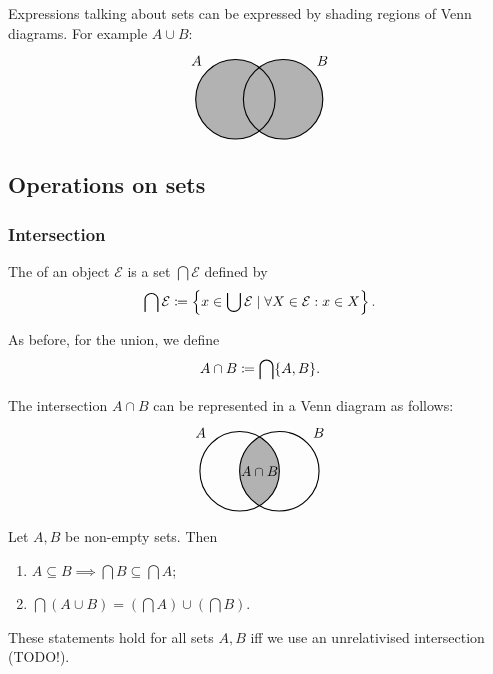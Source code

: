 Expressions talking about sets can be expressed by shading regions of Venn diagrams. For example $A\cup B$:
\[ \begin{tikzpicture}[thick,
    set/.style = {circle,
        minimum size = 2cm,
        fill=black!30}]

\node[set,label={135:$A$}] (A) at (0,0) {};

\node[set,label={45:$B$}] (B) at (1.2,0) {};

\draw (0,0) circle(1cm);
\draw (1.2,0) circle(1cm);
\end{tikzpicture} \]

\subsection{Operations on sets}
\subsubsection{Intersection}
\begin{definition}
The  of an object $\mathcal{E}$ is a set $\bigcap \mathcal{E}$ defined by
\[ \bigcap \mathcal{E} \coloneqq \left\{ x\in \bigcup\mathcal{E} \;|\; \forall X\in \mathcal{E}: x\in X \right\}. \]
\end{definition}
As before, for the union, we define
\[ A\cap B \coloneqq \bigcap \{A,B\}. \]

The intersection $A\cap B$ can be represented in a Venn diagram as follows:
\[ \begin{tikzpicture}[thick,
    set/.style = {circle,
        minimum size = 2cm}]

\node[set,label={135:$A$}] (A) at (0,0) {};

\node[set,label={45:$B$}] (B) at (1,0) {};

\begin{scope}
    \clip (0,0) circle(1cm);
    \clip (1,0) circle(1cm);
    \fill[black!30](0,0) circle(1cm);
\end{scope}

\draw (0,0) circle(1cm);
\draw (1,0) circle(1cm);

\node at (0.5,0) {$A\cap B$};
\end{tikzpicture} \]

\begin{proposition}
Let $A, B$ be non-empty sets. Then
\begin{enumerate}
\item $A \subseteq B \implies \bigcap B\subseteq \bigcap A$;
\item $\bigcap(A\cup B) = (\bigcap A)\cup (\bigcap B)$.
\end{enumerate}
These statements hold for all sets $A,B$ iff we use an unrelativised intersection (TODO!).
\end{proposition}

